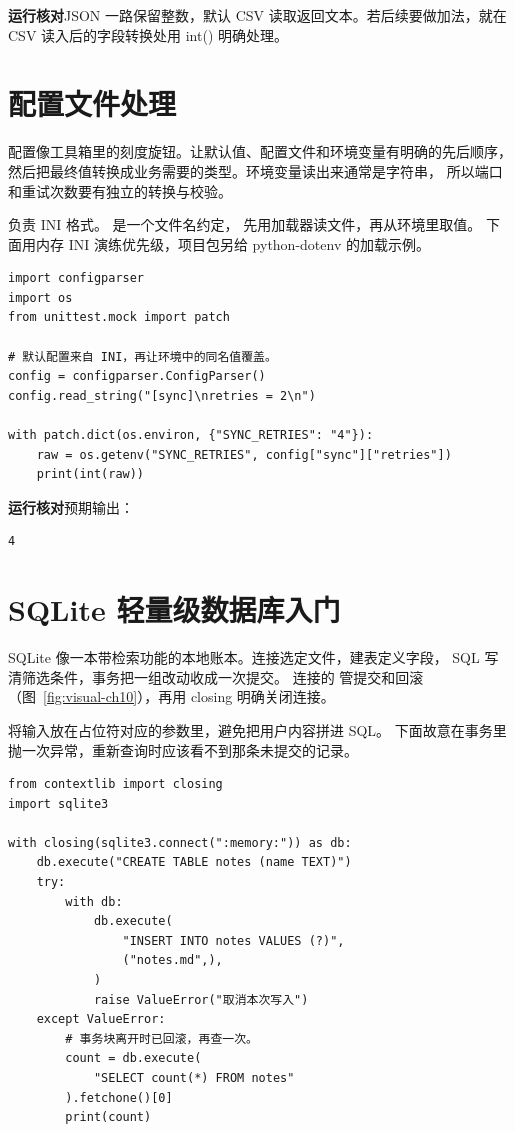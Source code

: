 \documentclass[UTF8,a4paper,oneside,openany,fontset=none,11pt]{ctexbook}
\newcommand{\code}[1]{\texttt{\detokenize{#1}}}
\begin{document}
\textbf{运行核对}\enspace JSON 一路保留整数，默认 CSV 读取返回文本。若后续要做加法，就在 CSV 读入后的字段转换处用 int() 明确处理。

\section{配置文件处理}

配置像工具箱里的刻度旋钮。让默认值、配置文件和环境变量有明确的先后顺序，
然后把最终值转换成业务需要的类型。环境变量读出来通常是字符串，
所以端口和重试次数要有独立的转换与校验。

\code{configparser} 负责 INI 格式。\code{.env} 是一个文件名约定，
先用加载器读文件，再从环境里取值。
下面用内存 INI 演练优先级，项目包另给 python-dotenv 的加载示例。


\begin{lstlisting}[title={\code{config_order.py}}]
import configparser
import os
from unittest.mock import patch

# 默认配置来自 INI，再让环境中的同名值覆盖。
config = configparser.ConfigParser()
config.read_string("[sync]\nretries = 2\n")

with patch.dict(os.environ, {"SYNC_RETRIES": "4"}):
    raw = os.getenv("SYNC_RETRIES", config["sync"]["retries"])
    print(int(raw))
\end{lstlisting}


\textbf{运行核对}\enspace 预期输出：
\begin{lstlisting}[language={},numbers=none]
4
\end{lstlisting}

\par


\section{SQLite 轻量级数据库入门}

SQLite 像一本带检索功能的本地账本。连接选定文件，建表定义字段，
SQL 写清筛选条件，事务把一组改动收成一次提交。
连接的 \code{with} 管提交和回滚（图~\ref{fig:visual-ch10}），再用 closing 明确关闭连接。

将输入放在占位符对应的参数里，避免把用户内容拼进 SQL。
下面故意在事务里抛一次异常，重新查询时应该看不到那条未提交的记录。


\begin{lstlisting}[title={\code{rollback_demo.py}}]
from contextlib import closing
import sqlite3

with closing(sqlite3.connect(":memory:")) as db:
    db.execute("CREATE TABLE notes (name TEXT)")
    try:
        with db:
            db.execute(
                "INSERT INTO notes VALUES (?)",
                ("notes.md",),
            )
            raise ValueError("取消本次写入")
    except ValueError:
        # 事务块离开时已回滚，再查一次。
        count = db.execute(
            "SELECT count(*) FROM notes"
        ).fetchone()[0]
        print(count)
\end{lstlisting}
\end{document}

